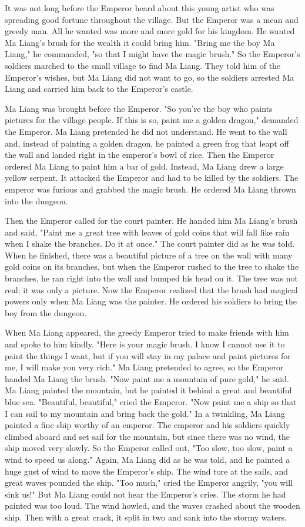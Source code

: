 It was not long before the Emperor heard about this young artist who was spreading good fortune throughout the village. But the Emperor was a mean and greedy man. All he wanted was more and more gold for his kingdom. He wanted Ma Liang's brush for the wealth it could bring him. "Bring me the boy Ma Liang," he commanded, "so that I might have the magic brush." So the Emperor's soldiers marched to the small village to find Ma Liang. They told him of the Emperor's wishes, but Ma Liang did not want to go, so the soldiers arrested Ma Liang and carried him back to the Emperor's castle.

Ma Liang was brought before the Emperor. "So you're the boy who paints pictures for the village people. If this is so, paint me a golden dragon," demanded the Emperor. Ma Liang pretended he did not understand. He went to the wall and, instead of painting a golden dragon, he painted a green frog that leapt off the wall and landed right in the emperor's bowl of rice. Then the Emperor ordered Ma Liang to paint him a bar of gold. Instead, Ma Liang drew a large yellow serpent. It attacked the Emperor and had to be killed by the soldiers. The emperor was furious and grabbed the magic brush. He ordered Ma Liang thrown into the dungeon.

Then the Emperor called for the court painter. He handed him Ma Liang's brush and said, "Paint me a great tree with leaves of gold coins that will fall like rain when I shake the branches. Do it at once." The court painter did as he was told. When he finished, there was a beautiful picture of a tree on the wall with many gold coins on its branches, but when the Emperor rushed to the tree to shake the branches, he ran right into the wall and bumped his head on it. The tree was not real; it was only a picture. Now the Emperor realized that the brush had magical powers only when Ma Liang was the painter. He ordered his soldiers to bring the boy from the dungeon.

When Ma Liang appeared, the greedy Emperor tried to make friends with him and spoke to him kindly. "Here is your magic brush. I know I cannot use it to paint the things I want, but if you will stay in my palace and paint pictures for me, I will make you very rich." Ma Liang pretended to agree, so the Emperor handed Ma Liang the brush. "Now paint me a mountain of pure gold," he said. Ma Liang painted the mountain, but he painted it behind a great and beautiful blue sea. "Beautiful, beautiful," cried the Emperor. "Now paint me a ship so that I can sail to my mountain and bring back the gold." In a twinkling, Ma Liang painted a fine ship worthy of an emperor. The emperor and his soldiers quickly climbed aboard and set sail for the mountain, but since there was no wind, the ship moved very slowly. So the Emperor called out, "Too slow, too slow, paint a wind to speed us along." Again, Ma Liang did as he was told, and he painted a huge gust of wind to move the Emperor's ship. The wind tore at the sails, and great waves pounded the ship. "Too much," cried the Emperor angrily, "you will sink us!" But Ma Liang could not hear the Emperor's cries. The storm he had painted was too loud. The wind howled, and the waves crashed about the wooden ship. Then with a great crack, it split in two and sank into the stormy waters.


